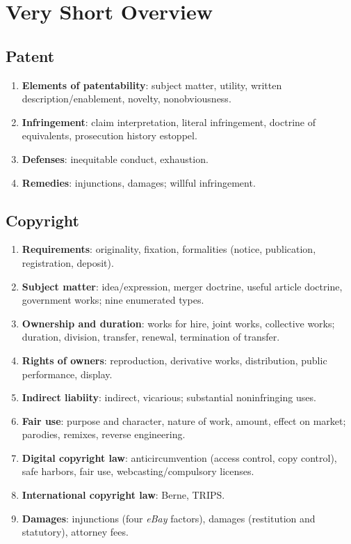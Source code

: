 \section{Very Short Overview}

\subsection{Patent}

\begin{enumerate}
    \item \textbf{Elements of patentability}: subject matter, utility, written 
    description/enablement, novelty, nonobviousness.
    \item \textbf{Infringement}: claim interpretation, literal infringement, 
    doctrine of equivalents, prosecution history estoppel.
    \item \textbf{Defenses}: inequitable conduct, exhaustion.
    \item \textbf{Remedies}: injunctions, damages; willful infringement.
\end{enumerate}

\subsection{Copyright}

\begin{enumerate}
    \item \textbf{Requirements}: originality, fixation, formalities (notice, 
    publication, registration, deposit).
    \item \textbf{Subject matter}: idea/expression, merger doctrine, useful 
    article doctrine, government works; nine enumerated types.
    \item \textbf{Ownership and duration}: works for hire, joint works, 
    collective works; duration, division, transfer, renewal, termination of 
    transfer.
    \item \textbf{Rights of owners}: reproduction, derivative works, 
    distribution, public performance, display.
    \item \textbf{Indirect liabiity}: indirect, vicarious; substantial 
    noninfringing uses.
    \item \textbf{Fair use}: purpose and character, nature of work, amount, 
    effect on market; parodies, remixes, reverse engineering.
    \item \textbf{Digital copyright law}: anticircumvention (access control, 
    copy control), safe harbors, fair use, webcasting/compulsory licenses.
    \item \textbf{International copyright law}: Berne, TRIPS.
    \item \textbf{Damages}: injunctions (four \emph{eBay} factors), damages 
    (restitution and statutory), attorney fees.
\end{enumerate}

